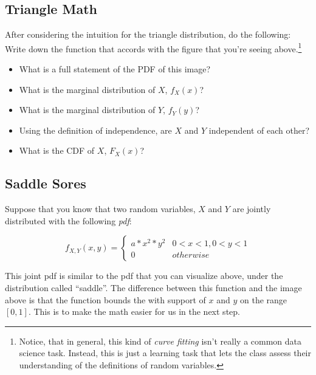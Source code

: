 \documentclass[
]{book}
\providecommand{\tightlist}{%
  \setlength{\itemsep}{0pt}\setlength{\parskip}{0pt}}
\theoremstyle{definition}
\theoremstyle{definition}
\theoremstyle{definition}
\theoremstyle{definition}
\theoremstyle{remark}
\begin{document}
\hypertarget{triangle-math}{%
\subsection{Triangle Math}\label{triangle-math}}

After considering the intuition for the triangle distribution, do the following: Write down the function that accords with the figure that you're seeing above.\footnote{Notice, that in general, this kind of \emph{curve fitting} isn't really a common data science task. Instead, this is just a learning task that lets the class assess their understanding of the definitions of random variables.}

\begin{itemize}
\tightlist
\item
  What is a full statement of the PDF of this image?
\item
  What is the marginal distribution of \(X\), \(f_{X}(x)\)?
\item
  What is the marginal distribution of \(Y\), \(f_{Y}(y)\)?
\item
  Using the definition of independence, are \(X\) and \(Y\) independent of each other?
\item
  What is the CDF of \(X\), \(F_{X}(x)\)?
\end{itemize}

\hypertarget{saddle-sores}{%
\subsection{Saddle Sores}\label{saddle-sores}}

Suppose that you know that two random variables, \(X\) and \(Y\) are jointly distributed with the following \emph{pdf}:

\[
f_{X,Y}(x,y) = 
  \begin{cases}
    a * x^{2} * y^{2} & 0 < x < 1, 0 < y < 1 \\
    0 & otherwise
  \end{cases}
\]

This joint pdf is similar to the pdf that you can visualize above, under the distribution called ``saddle''. The difference between this function and the image above is that the function bounds the with support of \(x\) and \(y\) on the range \([0,1]\). This is to make the math easier for us in the next step.
\end{document}
